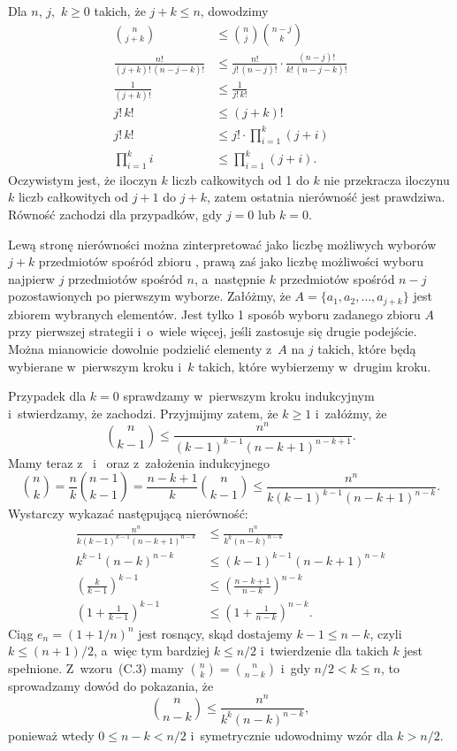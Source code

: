 \exercise{} %
Dla $n$, $j$,~$k\ge0$ takich, że $j+k\le n$, dowodzimy
\begin{align*}
	\binom{n}{j+k} &\le \binom{n}{j}\binom{n-j}{k} \\
	\frac{n!}{(j+k)!\,(n-j-k)!} &\le \frac{n!}{j!\,(n-j)!}\cdot\frac{(n-j)!}{k!\,(n-j-k)!} \\
	\frac{1}{(j+k)!} &\le \frac{1}{j!\,k!} \\
	j!\,k! &\le (j+k)! \\
	j!\,k! &\le j!\cdot\prod_{i=1}^k(j+i) \\
	\prod_{i=1}^ki &\le \prod_{i=1}^k(j+i).
\end{align*}
Oczywistym jest, że iloczyn $k$ liczb całkowitych od 1 do $k$ nie przekracza iloczynu $k$ liczb całkowitych od $j+1$ do $j+k$, zatem ostatnia nierówność jest prawdziwa. Równość zachodzi dla przypadków, gdy $j=0$ lub $k=0$.

Lewą stronę nierówności można zinterpretować jako liczbę możliwych wyborów $j+k$ przedmiotów spośród zbioru , prawą zaś jako liczbę możliwości wyboru najpierw $j$ przedmiotów spośród $n$, a~następnie $k$ przedmiotów spośród $n-j$ pozostawionych po pierwszym wyborze. Załóżmy, że $A=\{a_1,a_2,\dots,a_{j+k}\}$ jest zbiorem wybranych elementów. Jest tylko 1 sposób wyboru zadanego zbioru $A$ przy pierwszej strategii i~o~wiele więcej, jeśli zastosuje się drugie podejście. Można mianowicie dowolnie podzielić elementy z~$A$ na $j$ takich, które będą wybierane w~pierwszym kroku i~$k$ takich, które wybierzemy w~drugim kroku.

\exercise{} %
Przypadek dla $k=0$ sprawdzamy w~pierwszym kroku indukcyjnym i~stwierdzamy, że zachodzi. Przyjmijmy zatem, że $k\ge1$ i~załóżmy, że
\[
	\binom{n}{k-1} \le \frac{n^n}{(k-1)^{k-1}(n-k+1)^{n-k+1}}.
\]
Mamy teraz z~ i~ oraz z~założenia indukcyjnego
\[
	\binom{n}{k} = \frac{n}{k}\binom{n-1}{k-1} = \frac{n-k+1}{k}\binom{n}{k-1} \le \frac{n^n}{k(k-1)^{k-1}(n-k+1)^{n-k}}.
\]
Wystarczy wykazać następującą nierówność:
\begin{align*}
	\frac{n^n}{k(k-1)^{k-1}(n-k+1)^{n-k}} &\le \frac{n^n}{k^k(n-k)^{n-k}} \\[1mm]
	k^{k-1}(n-k)^{n-k} &\le (k-1)^{k-1}(n-k+1)^{n-k} \\[1mm]
	\left(\frac{k}{k-1}\right)^{k-1} &\le \left(\frac{n-k+1}{n-k}\right)^{n-k} \\
	\left(1+\frac{1}{k-1}\right)^{k-1} &\le \left(1+\frac{1}{n-k}\right)^{n-k}. \tag{$*$}\label{eq:C.1-12}
\end{align*}
Ciąg $e_n={(1+1/n)}^n$ jest rosnący, skąd dostajemy $k-1\le n-k$, czyli $k\le(n+1)/2$, a~więc tym bardziej $k\le n/2$ i~twierdzenie dla takich $k$ jest spełnione. Z~wzoru~(C.3) mamy $\binom{n}{k}=\binom{n}{n-k}$ i~gdy $n/2<k\le n$, to sprowadzamy dowód do pokazania, że
\[
	\binom{n}{n-k} \le \frac{n^n}{k^k(n-k)^{n-k}},
\]
ponieważ wtedy $0\le n-k<n/2$ i~symetrycznie udowodnimy wzór dla $k>n/2$.

